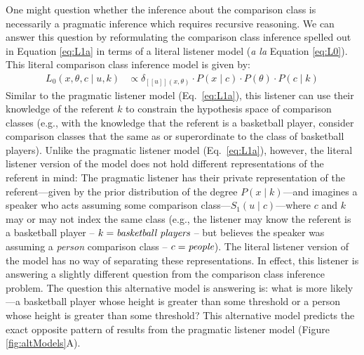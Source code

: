 \documentclass[doc]{apa6}
\begin{document}
One might question whether the inference about the comparison class is necessarily a pragmatic inference which requires recursive reasoning. 
We can answer this question by reformulating the comparison class inference  spelled out in Equation \ref{eq:L1a} in terms of a literal listener model (\emph{a la} Equation \ref{eq:L0}). 
This literal comparison class inference model is given by:
%
  \begin{align}
L_{0}(x, \theta, c \mid u, k) &\propto \delta_{[\![u]\!](x, \theta)} \cdot P(x \mid c)\cdot P(\theta) \cdot P(c \mid k)  \label{eq:L0alt}
\end{align}
%
Similar to the pragmatic listener model (Eq.~\ref{eq:L1a}), this listener can use their knowledge of the referent $k$ to constrain the hypothesis space of comparison classes (e.g., with the knowledge that the referent is a basketball player, consider comparison classes that the same as or superordinate to the class of basketball players).
Unlike the pragmatic listener model (Eq.~\ref{eq:L1a}), however, the literal listener version of the model does not hold different representations of the referent in mind: The pragmatic listener has their private representation of the referent---given by the prior distribution of the degree $P(x \mid k)$---and imagines a speaker who acts assuming some comparison class---$S_1(u \mid c)$---where $c$ and $k$ may or may not index the same class (e.g., the listener may know the referent is a basketball player -- $k = \emph{basketball players}$ -- but believes the speaker was assuming a \emph{person} comparison class -- $c = \emph{people}$).
The literal listener version of the model has no way of separating these representations.
In effect, this listener is answering a slightly different question from the comparison class inference problem. The question this alternative model is answering is: what is more likely---a basketball player whose height is greater than some threshold or a person whose height is greater than some threshold? 
This alternative model predicts the exact opposite pattern of results from the pragmatic listener model (Figure \ref{fig:altModels}A). 
\end{document}
